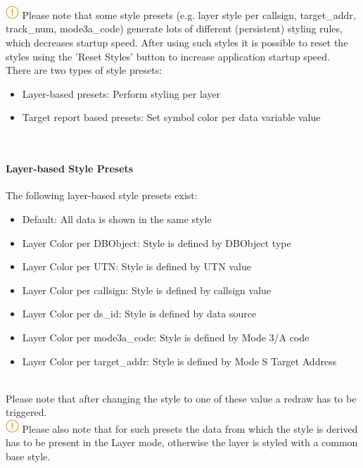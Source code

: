 \includegraphics[width=0.5cm]{../../data/icons/hint.png} Please note that some style presets (e.g. layer style per callsign, target\_addr, track\_num, mode3a\_code) generate lots of different (persistent) styling rules, which decreases startup speed. After using such styles it is possible to reset the styles using the 'Reset Styles' button to increase application startup speed. \\

There are two types of style presets:
\begin{itemize}
 \item Layer-based presets: Perform styling per layer
 \item Target report based presets: Set symbol color per data variable value
\end{itemize}
\  \\

\paragraph{Layer-based Style Presets}
The following layer-based style presets exist:
\begin{itemize}
 \item Default: All data is shown in the same style
 \item Layer Color per DBObject: Style is defined by DBObject type
 \item Layer Color per UTN: Style is defined by UTN value
 \item Layer Color per callsign: Style is defined by callsign value
 \item Layer Color per ds\_id: Style is defined by data source
 \item Layer Color per mode3a\_code: Style is defined by Mode 3/A code
 \item Layer Color per target\_addr: Style is defined by Mode S Target Address
\end{itemize}
\  \\

Please note that after changing the style to one of these value a redraw has to be triggered. \\

\includegraphics[width=0.5cm]{../../data/icons/hint.png} Please also note that for such presets the data from which the style is derived has to be present in the Layer mode, otherwise the layer is styled with a common base style.

